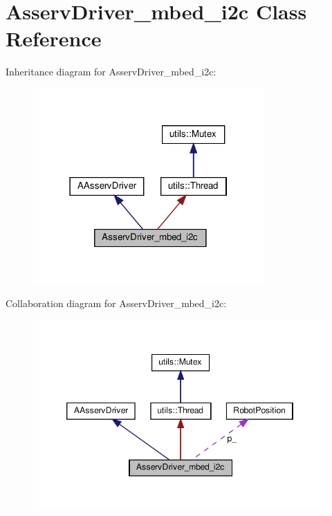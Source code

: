 \hypertarget{classAsservDriver__mbed__i2c}{}\section{Asserv\+Driver\+\_\+mbed\+\_\+i2c Class Reference}
\label{classAsservDriver__mbed__i2c}


Inheritance diagram for Asserv\+Driver\+\_\+mbed\+\_\+i2c\+:
\nopagebreak
\begin{figure}[H]
\begin{center}
\leavevmode
\includegraphics[width=250pt]{classAsservDriver__mbed__i2c__inherit__graph}
\end{center}
\end{figure}


Collaboration diagram for Asserv\+Driver\+\_\+mbed\+\_\+i2c\+:
\nopagebreak
\begin{figure}[H]
\begin{center}
\leavevmode
\includegraphics[width=346pt]{classAsservDriver__mbed__i2c__coll__graph}
\end{center}
\end{figure}
